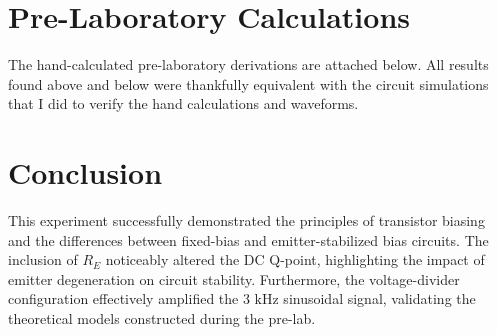 \documentclass[12pt, letterpaper]{article}
\begin{document}
\section{Pre-Laboratory Calculations}
The hand-calculated pre-laboratory derivations are attached below. All results found above and below were thankfully equivalent with the circuit simulations that I did to verify the hand calculations and waveforms.


\section{Conclusion}
This experiment successfully demonstrated the principles of transistor biasing and the differences between fixed-bias and emitter-stabilized bias circuits. The inclusion of $R_E$ noticeably altered the DC Q-point, highlighting the impact of emitter degeneration on circuit stability. Furthermore, the voltage-divider configuration effectively amplified the $3 \text{ kHz}$ sinusoidal signal, validating the theoretical models constructed during the pre-lab.
\end{document}
